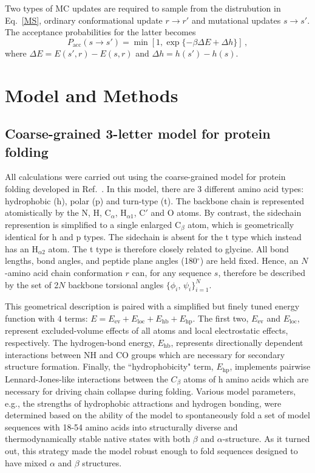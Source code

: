 \documentclass[%
 aip,
rsi,%
 amsmath,amssymb,
 reprint,%
]{revtex4-1}
\newcommand	 {\sbar}	{{s}}
\newcommand	 {\rbar}	{{r}}
\begin{document}
Two types of MC updates are required to sample from the distrubution in Eq.~\ref{MS}, ordinary conformational update $\rbar\rightarrow\rbar'$ and mutational updates $\sbar\rightarrow\sbar'$. The acceptance probabilities for the latter  becomes
\begin{equation}
P_\mathrm{acc} (\sbar\rightarrow\sbar') = \min [1, \exp\{-\beta\Delta E+\Delta h\}]\,,
\label{accrej}
\end{equation}
where $\Delta E = E(\sbar',\rbar)-E(\sbar,\rbar)$ and $\Delta h = h({\sbar'})-h(\sbar)$.

\section{Model and Methods}
\subsection{Coarse-grained 3-letter model for protein folding}
\noindent
All calculations were carried out using the coarse-grained model for protein folding developed in Ref.~. In this model, there are 3 different amino acid types: hydrophobic (h), polar (p) and turn-type (t). The backbone chain is represented atomistically by the N, H, $\mathrm{C}_\alpha$, $\mathrm{H}_{\alpha 1}$, C$'$ and O atoms. By contrast, the sidechain represention is simplified to a single enlarged $\mathrm{C}_\beta$ atom, which is geometrically identical for h and p types. The sidechain is absent for the t type which instead has an $\mathrm{H}_{\alpha 2}$ atom. The t type is therefore closely related to glycine. All bond lengths, bond angles, and peptide plane angles (180$^\circ$) are held fixed. Hence, an $N$-amino acid chain conformation $\rbar$ can, for any sequence $\sbar$, therefore be described by the set of 2$N$ backbone torsional angles $\{\phi_i$, $\psi_i\}_{i=1}^{N}$. 
 
This geometrical description is paired with a simplified but finely tuned energy function with 4 terms: $E= E_\mathrm{ev} + E_\mathrm{loc} + E_\mathrm{hb} + E_\mathrm{hp}$. The first two, $E_\mathrm{ev}$ and $E_\mathrm{loc}$, represent excluded-volume effects of all atoms and local electrostatic effects, respectively. The hydrogen-bond energy, $E_\mathrm{hb}$, represents directionally dependent interactions between NH and CO groups which are necessary for secondary structure formation. Finally, the ``hydrophobicity" term, $E_\mathrm{hp}$, implements pairwise Lennard-Jones-like interactions between the $C_\beta$ atoms of h amino acids which are necessary for driving chain collapse during folding. Various model parameters, e.g., the strengths of hydrophobic attractions and hydrogen bonding, were determined based on the ability of the model to spontaneously fold a set of model sequences with 18-54 amino acids into  structurally diverse and thermodynamically stable native states with both $\beta$ and $\alpha$-structure. As it turned out, this strategy made the model robust enough to fold sequences designed to have mixed $\alpha$ and $\beta$ structures. 
\end{document}
